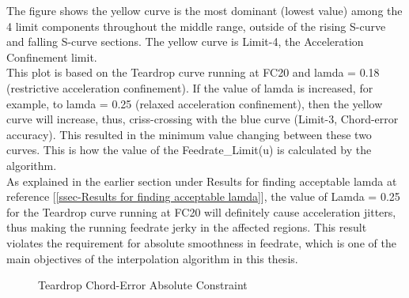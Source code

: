 The figure shows the yellow curve is the most dominant (lowest value) among the 4 limit components throughout the middle range, outside of the rising S-curve and falling S-curve sections. The yellow curve is Limit-4, the Acceleration Confinement limit.\\

This plot is based on the Teardrop curve running at FC20 and lamda = 0.18 (restrictive acceleration confinement). If the value of lamda is increased, for example, to lamda = 0.25 (relaxed acceleration confinement), then the yellow curve will increase, thus, criss-crossing with the blue curve (Limit-3, Chord-error accuracy). This resulted in the minimum value changing between these two curves. This is how the value of the Feedrate\_Limit(u) is calculated by the algorithm.\\  

As explained in the earlier section under Results for finding acceptable lamda at reference [\ref{ssec-Results for finding acceptable lamda}], the value of Lamda = 0.25 for the Teardrop curve running at FC20 will definitely cause acceleration jitters, thus making the running feedrate jerky in the affected regions. This result violates the requirement for absolute smoothness in feedrate, which is one of the main objectives of the interpolation algorithm in this thesis.


\clearpage
\pagebreak

\begin{figure}
	\caption  {Teardrop Chord-Error Absolute Constraint}
	\label{img-chap4-Teardrop Chord-Error Absolute Constraint.pdf}
\end{figure}	

